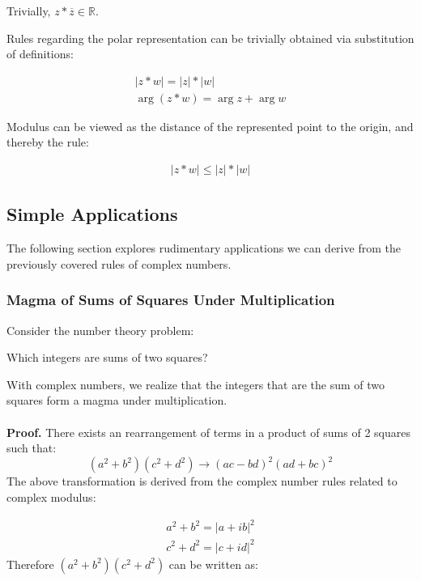 \documentclass[12pt]{article}
\begin{document}
	Trivially, $z * \overline z \in \mathbb{R}$.
	
	Rules regarding the polar representation can be trivially obtained via substitution of definitions:
	
	\begin{gather*}
		\lvert z * w \rvert = \lvert z \rvert * \lvert w \rvert \\
		\arg(z * w) = \arg z + \arg w
	\end{gather*}
	
	Modulus can be viewed as the distance of the represented point to the origin, and thereby the rule:
	
	\begin{gather*}
		\lvert z * w \rvert \leq \lvert z \rvert * \lvert w \rvert
	\end{gather*}
	
	\subsection{Simple Applications}
	
	The following section explores rudimentary applications we can derive from the previously covered rules of complex numbers.
	
	\subsubsection{Magma of Sums of Squares Under Multiplication}
	
	Consider the number theory problem:
	\begin{center}
		Which integers are sums of two squares?
	\end{center}
	
	With complex numbers, we realize that the integers that are the sum of two squares form a magma under multiplication.
	\\\\
	\textbf{Proof.} There exists an rearrangement of terms in a product of sums of 2 squares such that: $$(a^2 + b^2)(c^2 + d^2) \to (ac - bd)^2 (ad + bc)^2$$
	The above transformation is derived from the complex number rules related to complex modulus:
	
	\begin{gather*}
		a^2 + b^2 = \lvert a + ib \rvert ^2 \\
		c^2 + d^2 = \lvert c + id \rvert ^2
	\end{gather*}
	Therefore $(a^2 + b^2)(c^2 + d^2)$ can be written as:
	
\end{document}
